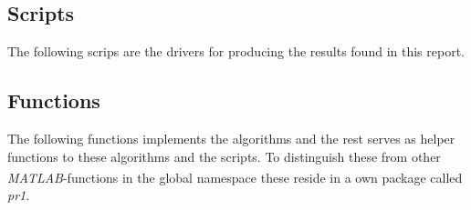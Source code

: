 \documentclass[10pt, a4paper]{article}
\newcommand{\matlab}{\small{\emph{MATLAB\textsuperscript{\textregistered}}}}
\begin{document}
\subsection{Scripts}
The following scrips are the drivers for producing the results found in this report.












\subsection{Functions}
The following functions implements the algorithms and the rest serves as helper functions to these algorithms and the scripts. To distinguish these from other \matlab{}-functions in the global namespace these reside in a own package called \emph{pr1}.











\end{document}
